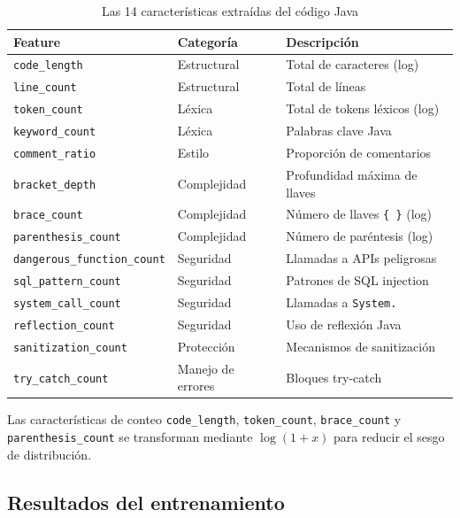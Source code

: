 \documentclass[12pt,a4paper]{article}
\begin{document}
\begin{table}[H]
\centering
\begin{tabular}{@{}lll@{}}
\toprule
\textbf{Feature}               & \textbf{Categoría}    & \textbf{Descripción} \\
\midrule
\texttt{code\_length}          & Estructural           & Total de caracteres (log) \\
\texttt{line\_count}           & Estructural           & Total de líneas \\
\texttt{token\_count}          & Léxica                & Total de tokens léxicos (log) \\
\texttt{keyword\_count}        & Léxica                & Palabras clave Java \\
\texttt{comment\_ratio}        & Estilo                & Proporción de comentarios \\
\texttt{bracket\_depth}        & Complejidad           & Profundidad máxima de llaves \\
\texttt{brace\_count}          & Complejidad           & Número de llaves \texttt{\{ \}} (log) \\
\texttt{parenthesis\_count}    & Complejidad           & Número de paréntesis (log) \\
\texttt{dangerous\_function\_count} & Seguridad        & Llamadas a APIs peligrosas \\
\texttt{sql\_pattern\_count}   & Seguridad             & Patrones de SQL injection \\
\texttt{system\_call\_count}   & Seguridad             & Llamadas a \texttt{System.} \\
\texttt{reflection\_count}     & Seguridad             & Uso de reflexión Java \\
\texttt{sanitization\_count}   & Protección            & Mecanismos de sanitización \\
\texttt{try\_catch\_count}     & Manejo de errores     & Bloques try-catch \\
\bottomrule
\end{tabular}
\caption{Las 14 características extraídas del código Java}
\end{table}

Las características de conteo \texttt{code\_length}, \texttt{token\_count}, \texttt{brace\_count} y \texttt{parenthesis\_count} se transforman mediante $\log(1+x)$ para reducir el sesgo de distribución.

\subsection{Resultados del entrenamiento}
\end{document}
